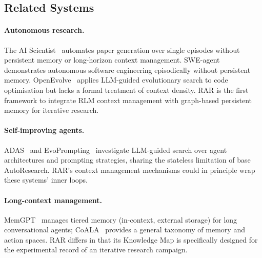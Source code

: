 \documentclass[conference]{IEEEtran}
\begin{document}
\subsection{Related Systems}

\paragraph{Autonomous research.}
The AI Scientist~\citep{lu2024aiscientist} automates paper generation over single episodes without persistent memory or long-horizon context management. SWE-agent~\citep{yang2024sweagent} demonstrates autonomous software engineering episodically without persistent memory. OpenEvolve~\citep{novack2025openevolve} applies LLM-guided evolutionary search to code optimisation but lacks a formal treatment of context density. RAR is the first framework to integrate RLM context management with graph-based persistent memory for iterative research.

\paragraph{Self-improving agents.}
ADAS~\citep{hu2024adas} and EvoPrompting~\citep{chen2023evoprompting} investigate LLM-guided search over agent architectures and prompting strategies, sharing the stateless limitation of base AutoResearch. RAR's context management mechanisms could in principle wrap these systems' inner loops.

\paragraph{Long-context management.}
MemGPT~\citep{packer2023memgpt} manages tiered memory (in-context, external storage) for long conversational agents; CoALA~\citep{sumers2023coala} provides a general taxonomy of memory and action spaces. RAR differs in that its Knowledge Map is specifically designed for the experimental record of an iterative research campaign.
\end{document}
